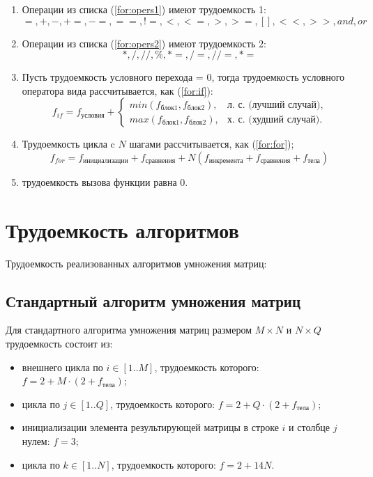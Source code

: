 \begin{enumerate}
	\item Операции из списка (\ref{for:opers1}) имеют трудоемкость 1:
	\begin{equation}
		\label{for:opers1}
		=, +, -, +=, -=, ==, !=, <, <=, >, >=, [], <<, >>, and, or
	\end{equation}
	\item Операции из списка (\ref{for:opers2}) имеют трудоемкость 2:
	\begin{equation}
		\label{for:opers2}
		*, /, //, \%, *=, /=, //=, *= 
	\end{equation}
	\item Пусть трудоемкость условного перехода = 0, тогда трудоемкость условного оператора вида  рассчитывается, как (\ref{for:if}):
	\begin{equation}
		\label{for:if}
		f_{if} = f_{\text{условия}} +
		\begin{cases}
			min(f_{блок1}, f_{блок2}), & \text{л. с. (лучший случай),}\\
			max(f_{блок1}, f_{блок2}), & \text{х. с. (худший случай).}
		\end{cases}
	\end{equation}
	\item Трудоемкость цикла c $N$ шагами рассчитывается, как (\ref{for:for});
	\begin{equation}
		\label{for:for}
		f_{for} = f_{\text{инициализации}} + f_{\text{сравнения}} + N(f_{\text{инкремента}} + f_{\text{сравнения}} + f_{\text{тела}})
	\end{equation}
	\item трудоемкость вызова функции равна 0.
\end{enumerate}


\section{Трудоемкость алгоритмов}

Трудоемкость реализованных алгоритмов умножения матриц:

\subsection{Стандартный алгоритм умножения матриц}

Для стандартного алгоритма умножения матриц размером $M \times N$ и  $N \times Q$ трудоемкость состоит из:

\begin{itemize}
	\item внешнего цикла по $i \in [1..M]$, трудоемкость которого: $f = 2 + M \cdot (2 + f_{тела})$;
	\item цикла по $j \in [1..Q]$, трудоемкость которого: $f = 2 + Q \cdot (2 + f_{тела})$;
	\item инициализации элемента результирующей матрицы в строке $i$ и столбце $j$ нулем: $f = 3$;
	\item цикла по $k \in [1..N]$, трудоемкость которого: $f = 2 + 14N$. \newline
\end{itemize}

